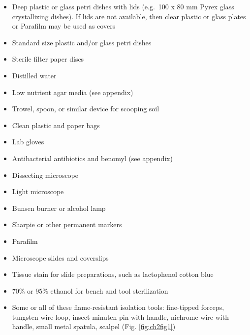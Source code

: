 \documentclass[]{book}
\providecommand{\tightlist}{%
  \setlength{\itemsep}{0pt}\setlength{\parskip}{0pt}}
\begin{document}
\begin{itemize}
\tightlist
\item
  Deep plastic or glass petri dishes with lids (e.g.~100 x 80 mm Pyrex
  glass crystallizing dishes). If lids are not available, then clear
  plastic or glass plates or Parafilm may be used as covers
\item
  Standard size plastic and/or glass petri dishes
\item
  Sterile filter paper discs
\item
  Distilled water
\item
  Low nutrient agar media (see appendix)
\item
  Trowel, spoon, or similar device for scooping soil
\item
  Clean plastic and paper bags
\item
  Lab gloves
\item
  Antibacterial antibiotics and benomyl (see appendix)
\item
  Dissecting microscope
\item
  Light microscope
\item
  Bunsen burner or alcohol lamp
\item
  Sharpie or other permanent markers
\item
  Parafilm
\item
  Microscope slides and coverslips
\item
  Tissue stain for slide preparations, such as lactophenol cotton blue
\item
  70\% or 95\% ethanol for bench and tool sterilization
\item
  Some or all of these flame-resistant isolation tools: fine-tipped
  forceps, tungsten wire loop, insect minuten pin with handle, nichrome
  wire with handle, small metal spatula, scalpel (Fig.
  \ref{fig:ch2fig1})
\end{itemize}
\end{document}
